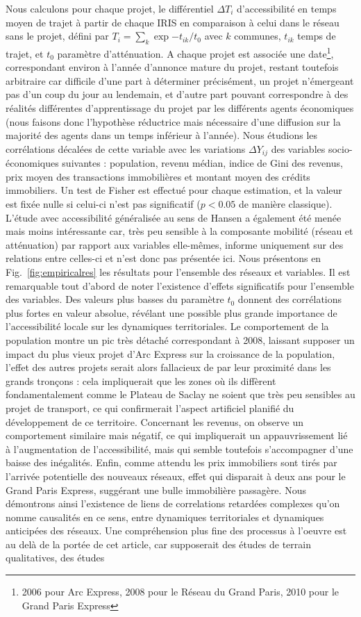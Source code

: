 \documentclass[english]{./sageo}
\begin{document}
Nous calculons pour chaque projet, le différentiel $\Delta T_i$ d'accessibilité en temps moyen de trajet à partir de chaque IRIS en comparaison à celui dans le réseau sans le projet, défini par $T_i = \sum_k \exp{-t_{ik}/t_0}$ avec $k$ communes, $t_{ik}$ temps de trajet, et $t_0$ paramètre d'atténuation. A chaque projet est associée une date\footnote{2006 pour Arc Express, 2008 pour le Réseau du Grand Paris, 2010 pour le Grand Paris Express}, correspondant environ à l'année d'annonce mature du projet, restant toutefois arbitraire car difficile d'une part à déterminer précisément, un projet n'émergeant pas d'un coup du jour au lendemain, et d'autre part pouvant correspondre à des réalités différentes d'apprentissage du projet par les différents agents économiques (nous faisons donc l'hypothèse réductrice mais nécessaire d'une diffusion sur la majorité des agents dans un temps inférieur à l'année). Nous étudions les corrélations décalées de cette variable avec les variations $\Delta Y_{ij}$ des variables socio-économiques suivantes : population, revenu médian, indice de Gini des revenus, prix moyen des transactions immobilières et montant moyen des crédits immobiliers. Un test de Fisher est effectué pour chaque estimation, et la valeur est fixée nulle si celui-ci n'est pas significatif ($p<0.05$ de manière classique). L'étude avec accessibilité généralisée au sens de Hansen a également été menée mais moins intéressante car, très peu sensible à la composante mobilité (réseau et atténuation) par rapport aux variables elle-mêmes, informe uniquement sur des relations entre celles-ci et n'est donc pas présentée ici. Nous présentons en Fig.~\ref{fig:empiricalres} les résultats pour l'ensemble des réseaux et variables. Il est remarquable tout d'abord de noter l'existence d'effets significatifs pour l'ensemble des variables. Des valeurs plus basses du paramètre $t_0$ donnent des corrélations plus fortes en valeur absolue, révélant une possible plus grande importance de l'accessibilité locale sur les dynamiques territoriales. Le comportement de la population montre un pic très détaché correspondant à 2008, laissant supposer un impact du plus vieux projet d'Arc Express sur la croissance de la population, l'effet des autres projets serait alors fallacieux de par leur proximité dans les grands tronçons : cela impliquerait que les zones où ils diffèrent fondamentalement comme le Plateau de Saclay ne soient que très peu sensibles au projet de transport, ce qui confirmerait l'aspect artificiel planifié du développement de ce territoire. Concernant les revenus, on observe un comportement similaire mais négatif, ce qui impliquerait un appauvrissement lié à l'augmentation de l'accessibilité, mais qui semble toutefois s'accompagner d'une baisse des inégalités. Enfin, comme attendu les prix immobiliers sont tirés par l'arrivée potentielle des nouveaux réseaux, effet qui disparait à deux ans pour le Grand Paris Express, suggérant une bulle immobilière passagère. Nous démontrons ainsi l'existence de liens de correlations retardées complexes qu'on nomme causalités en ce sens, entre dynamiques territoriales et dynamiques anticipées des réseaux. Une compréhension plus fine des processus à l'oeuvre est au delà de la portée de cet article, car supposerait des études de terrain qualitatives, des études 
\end{document}
